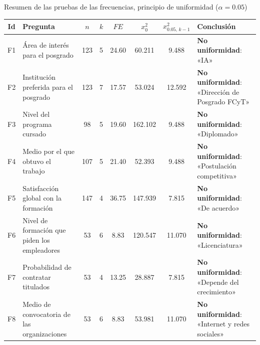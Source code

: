 \begin{mitabla}{Resumen de las pruebas de las frecuencias, principio de uniformidad ($\alpha = 0.05$)}
\begin{tabular}{cL{4.4cm}cccccL{3.2cm}}
\toprule
Id & Pregunta & $n$ & $k$ & $FE$ & $x_0^2$ & $x_{0.05,\,k-1}^2$ & Conclusión \\
\midrule
F1 & Área de interés para el posgrado & 123 & 5 & 24.60 & 60.211 & 9.488 & \textbf{No uniformidad}: «IA» \\
F2 & Institución preferida para el posgrado & 123 & 7 & 17.57 & 53.024 & 12.592 & \textbf{No uniformidad}: «Dirección de Posgrado FCyT» \\
F3 & Nivel del programa cursado & 98 & 5 & 19.60 & 162.102 & 9.488 & \textbf{No uniformidad}: «Diplomado» \\
F4 & Medio por el que obtuvo el trabajo & 107 & 5 & 21.40 & 52.393 & 9.488 & \textbf{No uniformidad}: «Postulación competitiva» \\
F5 & Satisfacción global con la formación & 147 & 4 & 36.75 & 147.939 & 7.815 & \textbf{No uniformidad}: «De acuerdo» \\
F6 & Nivel de formación que piden los empleadores & 53 & 6 & 8.83 & 120.547 & 11.070 & \textbf{No uniformidad}: «Licenciatura» \\
F7 & Probabilidad de contratar titulados & 53 & 4 & 13.25 & 28.887 & 7.815 & \textbf{No uniformidad}: «Depende del crecimiento» \\
F8 & Medio de convocatoria de las organizaciones & 53 & 6 & 8.83 & 53.981 & 11.070 & \textbf{No uniformidad}: «Internet y redes sociales» \\
\bottomrule
\end{tabular}
\end{mitabla}

